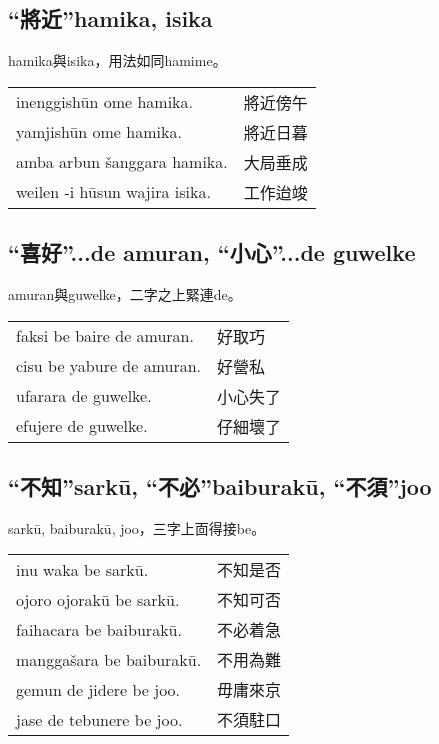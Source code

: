 \documentclass{article}
\begin{document}
\subsection{“將近”hamika, isika}
\noindent hamika與isika，用法如同hamime。
\begin{center}
    \begin{tabularx}{\textwidth}{XX}
        inenggish\={u}n ome hamika. & 將近傍午\\
        yamjish\={u}n ome hamika. & 將近日暮\\
        amba arbun \v{s}anggara hamika. & 大局垂成\\
        weilen -i h\={u}sun wajira isika. & 工作迨竣
    \end{tabularx}
\end{center}

\subsection{“喜好”...de amuran, “小心”...de guwelke}
\noindent amuran與guwelke，二字之上緊連de。
\begin{center}
    \begin{tabularx}{\textwidth}{XX}
        faksi be baire de amuran.&好取巧\\
        cisu be yabure de amuran. &好營私\\
        ufarara de guwelke. &小心失了\\
        efujere de guwelke. & 仔細壞了
    \end{tabularx}
\end{center}

\subsection{“不知”sark\={u}, “不必”baiburak\={u}, “不須”joo}
\noindent sark\={u}, baiburak\={u}, joo，三字上靣得接be。
\begin{center}
    \begin{tabularx}{\textwidth}{XX}
        inu waka be sark\={u}.&不知是否\\
        ojoro ojorak\={u} be sark\={u}. &不知可否\\
        faihacara be baiburak\={u}. &不必着急\\
        mangga\v{s}ara be baiburak\={u}. &不用為難\\
        gemun de jidere be joo. &毋庸來京\\
        jase de tebunere be joo. &不須駐口
    \end{tabularx}
\end{center}
\end{document}
